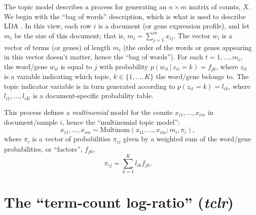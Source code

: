\documentclass[final]{siamart171218}
\begin{document}
The topic model describes a process for generating an $n \times m$
matrix of counts, $X$. We begin with the ``bag of words'' description,
which is what is used to describe LDA \cite{blei-2003}. In this view,
each row $i$ is a document (or gene expression profile), and let $m_i$
be the size of this document; that is, $m_i = \sum_{j=1}^m
x_{ij}$. The vector $w_i$ is a vector of terms (or genes) of length
$m_i$ (the order of the words or genes appearing in this vector
doesn't matter, hence the ``bag of words''). For each $t = 1, \ldots,
m_{i}$, the word/gene $w_{it}$ is equal to $j$ with probability
$p(w_{it} \,|\, z_{it} = k) = f_{jk}$, where $z_{it}$ is a variable
indicating which topic, $k \in \{1, \ldots, K\}$ the word/gene belongs
to. The topic indicator variable is in turn generated according to
$p(z_{it} = k) = l_{ik}$, where $l_{i1}, \ldots, l_{iK}$ is a
document-specific probability table.

This process defines a {\em multinomial} model for the 
counts $x_{i1}, \ldots, x_{im}$ in document/sample $i$, hence the
``multinomial topic model'':
\begin{equation}
x_{i1}, \ldots, x_{im} \sim
\mathrm{Multinom}(x_{i1}, \ldots, x_{im}; m_i, \pi_i),
\end{equation}
where $\pi_i$ is a vector of probabilities $\pi_{ij}$ given by a
weighted sum of the word/gene probabilities, or ``factors'', $f_{jk}$,
\begin{equation}
\pi_{ij} = \sum_{k=1}^K l_{ik} f_{jk}.
\end{equation}

\section{The ``term-count log-ratio'' ({\em tclr})}
\end{document}
